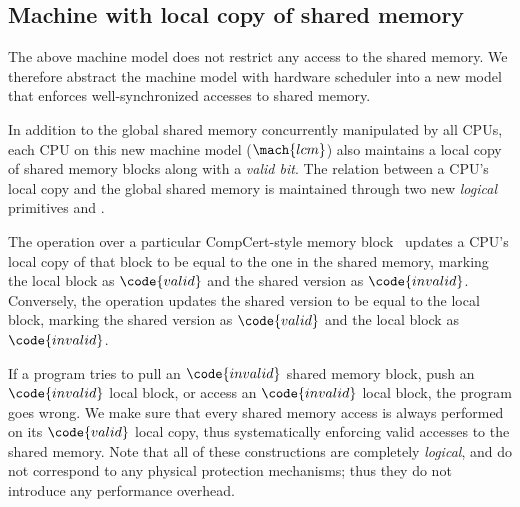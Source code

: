 \subsection{Machine with local copy of shared memory}
\label{ssec:spec:lcm}

The above machine model does not restrict any access to the shared
memory.  We therefore abstract the machine model with hardware
scheduler into a new model that enforces well-synchronized accesses to
shared memory.

In addition to the global shared memory concurrently manipulated by
all CPUs, each CPU on this new machine model ($\mach{lcm}$) also
maintains a local copy of shared memory blocks along with a \emph{valid bit}.  The relation
between a CPU's local copy and the global shared memory is maintained
through two new \emph{logical} primitives  and .

The  operation over a particular CompCert-style memory block~\cite{compcert}
updates a CPU's local copy of that block to be equal to the one in 
the shared memory, marking the local block as $\code{valid}$ and the
shared version as $\code{invalid}$.  Conversely, the 
operation updates the shared version to be equal to the local block,
marking the shared version as $\code{valid}$ and the local block as
$\code{invalid}$.

If a program tries to pull an $\code{invalid}$ shared memory block,
push an $\code{invalid}$ local block, or access an $\code{invalid}$
local block, the program goes wrong.  We make sure that every shared
memory access is always performed on its $\code{valid}$ local copy,
thus systematically enforcing valid accesses to the shared memory.
Note that all of these constructions are completely \emph{logical},
and do not correspond to any physical protection mechanisms; thus they
do not introduce any performance overhead.

